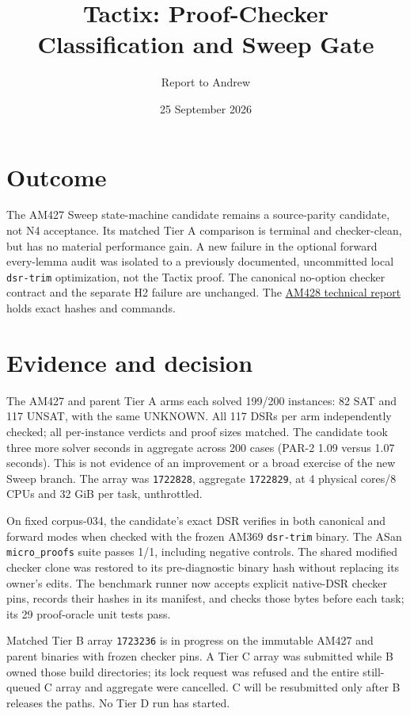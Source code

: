 \documentclass[11pt]{article}
\title{Tactix: Proof-Checker Classification and Sweep Gate}
\author{Report to Andrew}
\date{25 September 2026}
\begin{document}
\maketitle
\vspace{-1.5em}

\section*{Outcome}
The AM427 Sweep state-machine candidate remains a source-parity candidate,
not N4 acceptance. Its matched Tier A comparison is terminal and
checker-clean, but has no material performance gain. A new failure in the
optional forward every-lemma audit was isolated to a previously documented,
uncommitted local \texttt{dsr-trim} optimization, not the Tactix proof. The
canonical no-option checker contract and the separate H2 failure are unchanged.
The \href{../../benchmarks/reports/2026-09-25-am428-sweep-proof-pin-and-tier-a.md}{AM428 technical report}
holds exact hashes and commands.

\section*{Evidence and decision}
The AM427 and parent Tier A arms each solved 199/200 instances: 82 SAT and
117 UNSAT, with the same UNKNOWN. All 117 DSRs per arm independently checked;
all per-instance verdicts and proof sizes matched. The candidate took three
more solver seconds in aggregate across 200 cases (PAR-2 1.09 versus 1.07
seconds). This is not evidence of an improvement or a broad exercise of the
new Sweep branch. The array was \texttt{1722828}, aggregate \texttt{1722829},
at 4 physical cores/8 CPUs and 32 GiB per task, unthrottled.

On fixed corpus-034, the candidate's exact DSR verifies in both canonical and
forward modes when checked with the frozen AM369 \texttt{dsr-trim} binary. The
ASan \texttt{micro\_proofs} suite passes 1/1, including negative controls.
The shared modified checker clone was restored to its pre-diagnostic binary
hash without replacing its owner's edits. The benchmark runner now accepts
explicit native-DSR checker pins, records their hashes in its manifest, and
checks those bytes before each task; its 29 proof-oracle unit tests pass.

Matched Tier B array \texttt{1723236} is in progress on the immutable AM427
and parent binaries with frozen checker pins. A Tier C array was submitted
while B owned those build directories; its lock request was refused and the
entire still-queued C array and aggregate were cancelled. C will be
resubmitted only after B releases the paths. No Tier D run has started.
\end{document}
